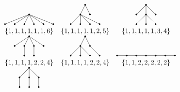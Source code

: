 \documentclass{article}
\begin{document}
	\[\begin{array}{ccc}
	\begin{tikzpicture}[scale=.5]
		\draw(-2.5,0)--(0,1)--(2.5,0);\draw(-1.5,0)--(0,1)--(1.5,0);\draw(-.5,0)--(0,1)--(.5,0);
		\filldraw(-2.5,0)circle(2pt)(2.5,0)circle(2pt)(-1.5,0)circle(2pt)(1.5,0)circle(2pt)(-.5,0)circle(2pt)(.5,0)circle(2pt)(0,1)circle(2pt);
	\end{tikzpicture}&\begin{tikzpicture}[scale=.5]
		\draw(-1.5,0)--(-.5,1)--(1.5,0);\draw(-.5,0)--(-.5,1)--(0,2)--(.5,1);\draw(.5,0)--(-.5,1);
		\filldraw(.5,1)circle(2pt)(0,2)circle(2pt)(-1.5,0)circle(2pt)(1.5,0)circle(2pt)(-.5,0)circle(2pt)(.5,0)circle(2pt)(-.5,1)circle(2pt);
	\end{tikzpicture}&\begin{tikzpicture}[scale=.5]
		\draw(-1,0)--(0,1)--(0,2)--(1,1);\draw(0,2)--(-1,1);\draw(0,0)--(0,1)--(1,0);
		\filldraw(-1,0)circle(2pt)(0,0)circle(2pt)(1,0)circle(2pt)(-1,1)circle(2pt)(0,1)circle(2pt)(1,1)circle(2pt)(0,2)circle(2pt);
	\end{tikzpicture}
	\\
	\{1, 1, 1, 1, 1, 1, 6\}&\{1, 1, 1, 1, 1, 2, 5\}&\{1, 1, 1, 1, 1, 3, 4\}
	\\
	\begin{tikzpicture}[scale=.5]
		\draw(-1.5,1)--(0,2)--(1.5,1);\draw(-.5,0)--(-.5,1)--(0,2)--(.5,1)--(.5,0);
		\filldraw(0,2)circle(2pt)(-1.5,1)circle(2pt)(-.5,1)circle(2pt)(.5,1)circle(2pt)(1.5,1)circle(2pt)(-.5,0)circle(2pt)(.5,0)circle(2pt);
	\end{tikzpicture}&\begin{tikzpicture}[scale=.5]
		\draw(-1.5,0)--(-.5,1)--(0,2)--(.5,1)--(1.5,0);\draw(-.5,0)--(-.5,1)--(.5,0);
		\filldraw(0,2)circle(2pt)(-1.5,0)circle(2pt)(-.5,0)circle(2pt)(.5,0)circle(2pt)(1.5,0)circle(2pt)(-.5,1)circle(2pt)(.5,1)circle(2pt);
	\end{tikzpicture}&\begin{tikzpicture}[scale=.5]
		\filldraw(-3,0)circle(2pt)--(-2,0)circle(2pt)--(-1,0)circle(2pt)--(0,0)circle(2pt)--(1,0)circle(2pt)--(2,0)circle(2pt)--(3,0)circle(2pt);
	\end{tikzpicture}
	\\
	\{1, 1, 1, 1, 2, 2, 4\}&\{1, 1, 1, 1, 2, 2, 4\}&\{1, 1, 2, 2, 2, 2, 2\}
	\\
	\begin{tikzpicture}[scale=.5]
		\draw(-1,0)--(-1,1)--(0,2)--(1,1)--(1,0);\draw(0,0)--(0,1)--(0,2);
		\filldraw(-1,0)circle(2pt)(-1,1)circle(2pt)(0,2)circle(2pt)(1,1)circle(2pt)(1,0)circle(2pt)(0,0)circle(2pt)(0,1)circle(2pt);

\end{tikzpicture}
\end{array}\]
\end{document}
